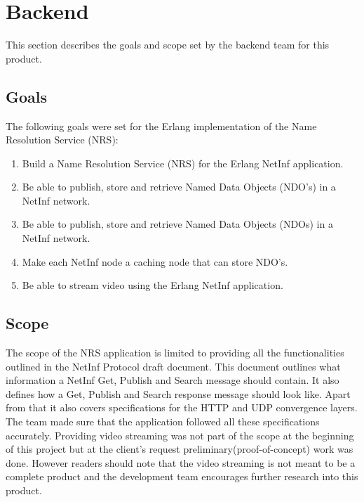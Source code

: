 \section{Backend}
This section describes the goals and scope set by the backend team for this product.

\subsection{Goals}
The following goals were set for the Erlang implementation of the Name Resolution Service (NRS):
\begin{enumerate}

\item {Build a Name Resolution Service (NRS) for the Erlang NetInf application.}\\ 
\item {Be able to publish, store and retrieve Named Data Objects (NDO's) in a NetInf network.}\\
\item {Be able to publish, store and retrieve Named Data Objects (NDOs) in a NetInf network.}\\
\item {Make each NetInf node a caching node that can store NDO's.}\\
\item {Be able to stream video using the Erlang NetInf application.}\\
\end{enumerate}

\subsection{Scope}
The scope of the NRS application is limited to providing all the functionalities outlined in the NetInf Protocol draft document. \cite{netinfproto} This document outlines what information a NetInf Get, Publish and Search message should contain. It also defines how a Get, Publish and Search response message should look like. Apart from that it also covers specifications for the HTTP and UDP convergence layers. The team made sure that the application followed all these specifications accurately. Providing video streaming was not part of the scope at the beginning of this project but at the client's request preliminary(proof-of-concept) work was done. However readers should note that the video streaming is not meant to be a complete product and the development team encourages further research into this product.
